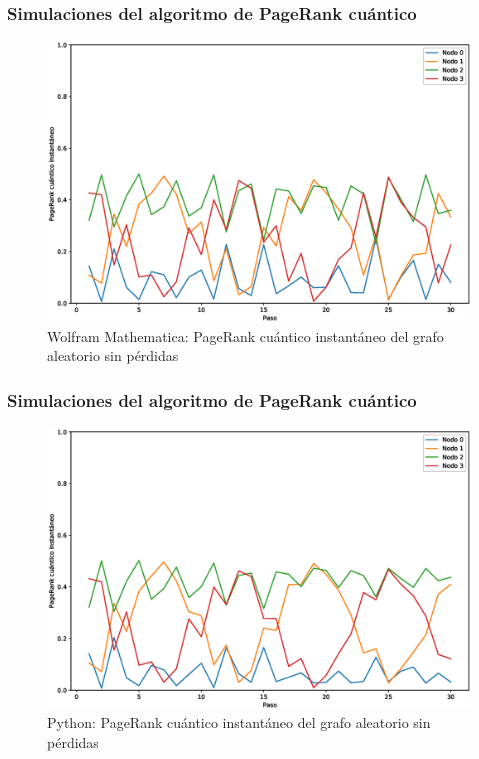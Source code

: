 \documentclass[xetex,mathserif,serif, 8pt]{beamer}
\begin{document}
\begin{frame}
    \frametitle{Simulaciones del algoritmo de PageRank cuántico}

    \begin{figure}[H]
        \centering
        \includegraphics[width=0.9\linewidth]{img/any-inst-M.eps}
        \caption{Wolfram Mathematica: PageRank cuántico instantáneo del grafo aleatorio sin pérdidas}
    \end{figure}

\end{frame}

\begin{frame}
    \frametitle{Simulaciones del algoritmo de PageRank cuántico}

    \begin{figure}[H]
        \centering
        \includegraphics[width=0.9\linewidth]{img/any-inst-lossless.eps}
        \caption{Python: PageRank cuántico instantáneo del grafo aleatorio sin pérdidas}
    \label{fig:instanylossless}
    \end{figure}

\end{frame}
\end{document}

